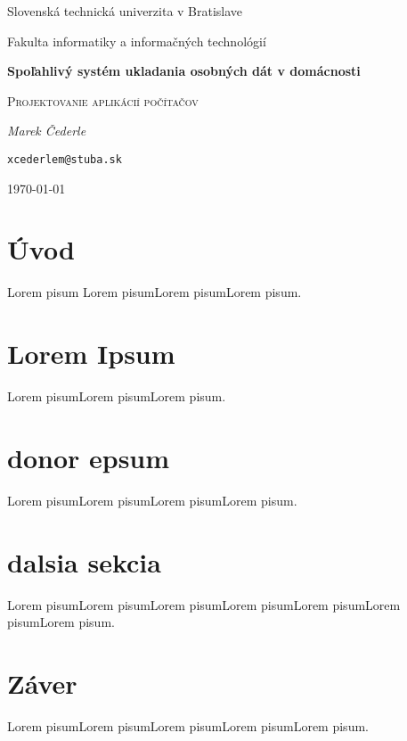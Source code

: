 \documentclass[12pt,oneside,slovak,a4paper]{article}
\begin{document}

\begin{titlepage}
	\centering
    {\Large Slovenská technická univerzita v Bratislave\par}
    {\Large Fakulta informatiky a informačných technológií\par}
	\vspace{7cm}
	{\huge\bfseries Spoľahlivý systém ukladania osobných dát v domácnosti\par}
	\vspace{0.5cm}
    {\Large \textsc{Projektovanie aplikácií počítačov}\par}
    \vspace{1cm}
	{\Large\itshape Marek Čederle\par}
    {\small\texttt{xcederlem@stuba.sk}\par}
	\vfill

	{\large \today\par}
\end{titlepage}

\begin{abstract}
    Cieľom môjho projektu bude zamerať sa, akým spôsobom si môže bežný človek sprevádzkovať spoľahlivý systém na ukladanie, prípadne zálohovanie dát. Bude sa jednať o návrh a sprevádzkovanie dátového servera (NAS) v domácnosti, ktorý sa bude skladať s bežných počítačových komponentov a jeho zapojenia v počítačovej sieti vrátane potrebnej kabeláže. Neoddeliteľnou súčasťou môjho projektu bude vhodný výber SW riešenia, ktoré bude na tomto HW "bežať". Taktiež pôjde o jeho umiestnenie v domácnosti vzhľadom na hlučnosť tohto systému. Na záver by som chcel porovnať cenu s konkurencieschopným komerčným riešením.
\end{abstract}

\tableofcontents

\section{Úvod}
Lorem pisum\cite{TEST} Lorem pisumLorem pisumLorem pisum.

\section{Lorem Ipsum}
Lorem pisumLorem pisumLorem pisum.

\section{donor epsum}
Lorem pisumLorem pisumLorem pisumLorem pisum.

\section{dalsia sekcia}
Lorem pisumLorem pisumLorem pisumLorem pisumLorem pisumLorem pisumLorem pisum.

\section{Záver}
Lorem pisumLorem pisumLorem pisumLorem pisumLorem pisum.



\end{document}
